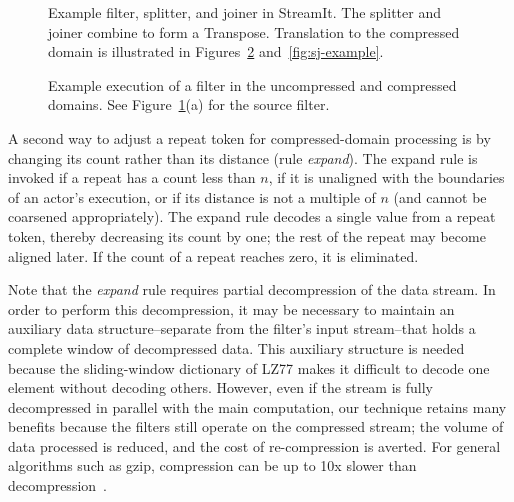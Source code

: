 \begin{figure}[t!]
\caption[Example StreamIt code to be mapped into the compressed
  domain]{Example filter, splitter, and joiner in StreamIt.  The
  splitter and joiner combine to form a Transpose. Translation to the
  compressed domain is illustrated in Figures~\ref{fig:filter-example}
  and~\ref{fig:sj-example}.\protect\label{fig:streamit-example}}
\end{figure}

\begin{figure}[t!]
\caption[Example execution of a filter in the uncompressed and
  compressed domains]{Example execution of a filter in the
  uncompressed and compressed domains.  See
  Figure~\ref{fig:streamit-example}(a) for the source
  filter.\protect\label{fig:filter-example}}
\end{figure}

A second way to adjust a repeat token for compressed-domain processing
is by changing its count rather than its distance (rule {\it expand}).
The expand rule is invoked if a repeat has a count less than $n$, if
it is unaligned with the boundaries of an actor's execution, or if its
distance is not a multiple of $n$ (and cannot be coarsened
appropriately).  The expand rule decodes a single value from a repeat
token, thereby decreasing its count by one; the rest of the repeat may
become aligned later.  If the count of a repeat reaches zero, it is
eliminated.

Note that the {\it expand} rule requires partial decompression of the
data stream.  In order to perform this decompression, it may be
necessary to maintain an auxiliary data structure--separate from the
filter's input stream--that holds a complete window of decompressed
data.  This auxiliary structure is needed because the sliding-window
dictionary of LZ77 makes it difficult to decode one element without
decoding others.  However, even if the stream is fully decompressed in
parallel with the main computation, our technique retains many
benefits because the filters still operate on the compressed stream;
the volume of data processed is reduced, and the cost of
re-compression is averted.  For general algorithms such as gzip,
compression can be up to 10x slower than
decompression~\cite{ziviani00compression}.

